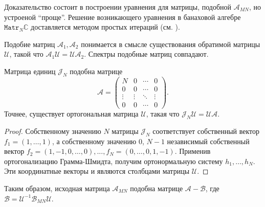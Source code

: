 Доказательство состоит в построении уравнения для матрицы, подобной \( \mathscr{A}_{MN} \),
но устроеной ``проще''. Решение возникающего уравнения в банаховой алгебре \( \mathtt{Matr}_N\mathbb{C} \)
доставляется методом простых итераций (см. \cite{baskakov-harmonic}).

Подобие матриц \( \mathcal{A}_1, \mathcal{A}_2 \)
понимается в смысле существования обратимой матрицы \( \mathcal{U} \),
такой что \( \mathcal{A}_1 \mathcal{U} = \mathcal{U} \mathcal{A}_2 \).
Спектры подобные матриц совпадают.

\begin{lemma}
    Матрица единиц \( \mathcal{J}_N \) подобна матрице
    \[
        \mathcal{A} = \begin{pmatrix}
            N & 0 & \cdots & 0 \\
            0 & 0 & \cdots & 0 \\
            \vdots & \vdots & \ddots & \vdots \\
            0 & 0 & \cdots & 0
        \end{pmatrix}. \]
    Точнее, существует ортогональная матрица \( \mathcal{U} \),
    такая что
    \( \mathcal{J}_N \mathcal{U} = \mathcal{U} \mathcal{A} \).
\end{lemma}
\begin{proof}
    Собственному значению \( N \) матрицы \( \mathcal{J}_N \) 
    соответствует собственный вектор \( f_1 = {\left(1,\ldots,1\right)} \),
        а собственному значению \( 0 \), \( N-1 \) независимый собственный вектор
        \( f_2 = {\left(1,-1,0,\ldots,0\right)}, ...,
           f_N = {\left(0,\ldots,0,1,-1\right)} \).
    Применив ортогонализацию Грамма-Шмидта, получим ортонормальную систему \( h_1, \ldots, h_N \).
    Эти координатные векторы и являются столбцами матрицы \( \mathcal{U} \).
\end{proof}

Таким образом, исходная матрица \( \mathcal{A}_{MN} \) подобна матрице
\( \mathcal{A} - \mathcal{B} \), где \( \mathcal{B} = \mathcal{U}^{-1} \mathscr{B}_{MN} \mathcal{U} \).
